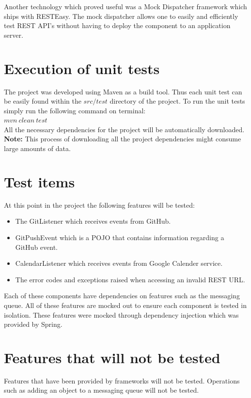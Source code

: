 \documentclass[11pt,a4paper]{article}
\begin{document}
Another technology which proved useful was a Mock Dispatcher framework which ships with RESTEasy. The mock dispatcher allows one to easily and efficiently test REST API's without having to deploy the component to an application server.

\section{Execution of unit tests}
The project was developed using Maven as a build tool. Thus each unit test can be easily found within the $src/test$ directory of the project. To run the unit tests simply run the following command on terminal: \\

$mvn\ clean\ test$ \\

All the necessary dependencies for the project will be automatically downloaded. \textbf{Note:} This process of downloading all the project dependencies might consume large amounts of data.

\section{Test items}
At this point in the project the following features will be tested:
\begin{itemize}
	\item The GitListener which receives events from GitHub.
	\item GitPushEvent which is a POJO that contains information regarding a GitHub event.
	\item CalendarListener which receives events from Google Calender service.
	\item The error codes and exceptions raised when accessing an invalid REST URL.
\end{itemize}

Each of these components have dependencies on features such as the messaging queue. All of these features are mocked out to ensure each component is tested in isolation. These features were mocked through dependency injection which was provided by Spring. \\

\section{Features that will not be tested}

Features that have been provided by frameworks will not be tested. Operations such as adding an object to a messaging queue will not be tested.
\end{document}
